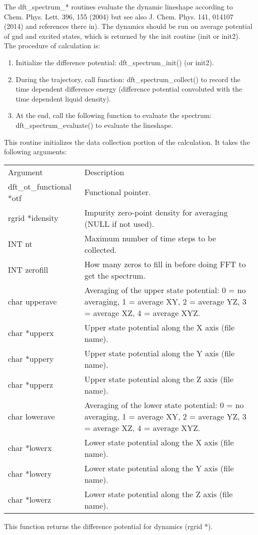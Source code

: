 \documentclass[12pt,letterpaper]{report}
\begin{document}
The dft\_spectrum\_* routines evaluate the dynamic lineshape according to Chem. Phys. Lett. 396, 155 (2004) but see also J. Chem. Phys. 141, 014107 (2014) and references there in). The dynamics should be run on average potential of gnd and excited states, which is returned by the init routine (init or init2). The procedure of calculation is:
\begin{enumerate}
\item Initialize the difference potential: dft\_spectrum\_init() (or init2).
\item During the trajectory, call function: dft\_spectrum\_collect() to record the time dependent difference energy (difference potential convoluted with the time dependent liquid density).
\item At the end, call the following function to evaluate the spectrum: dft\_spectrum\_evaluate() to evaluate the lineshape.
\end{enumerate}

This routine initializes the data collection portion of the calculation. It takes the following arguments:
\begin{longtable}{p{} p{}}
Argument & Description\\
\cline{1-2}
dft\_ot\_functional *otf & Functional pointer.\\
rgrid *idensity & Impurity zero-point density for averaging (NULL if not used).\\
INT nt & Maximum number of time steps to be collected.\\
INT zerofill & How many zeros to fill in before doing FFT to get the spectrum.\\
char upperave & Averaging of the upper state potential: 0 = no averaging, 1 = average XY, 2 = average YZ, 3 = average XZ, 4 = average XYZ.\\
char *upperx & Upper state potential along the X axis (file name).\\
char *uppery & Upper state potential along the Y axis (file name).\\
char *upperz & Upper state potential along the Z axis (file name).\\
char lowerave & Averaging of the lower state potential: 0 = no averaging, 1 = average XY, 2 = average YZ, 3 = average XZ, 4 = average XYZ.\\
char *lowerx & Lower state potential along the X axis (file name).\\
char *lowery & Lower state potential along the Y axis (file name).\\
char *lowerz & Lower state potential along the Z axis (file name).\\
\end{longtable}
\noindent
This function returns the difference potential for dynamics (rgrid *).
\end{document}
